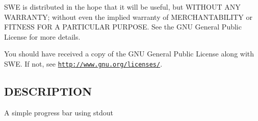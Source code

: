 S\-W\-E is distributed in the hope that it will be useful, but W\-I\-T\-H\-O\-U\-T A\-N\-Y W\-A\-R\-R\-A\-N\-T\-Y; without even the implied warranty of M\-E\-R\-C\-H\-A\-N\-T\-A\-B\-I\-L\-I\-T\-Y or F\-I\-T\-N\-E\-S\-S F\-O\-R A P\-A\-R\-T\-I\-C\-U\-L\-A\-R P\-U\-R\-P\-O\-S\-E. See the G\-N\-U General Public License for more details.

You should have received a copy of the G\-N\-U General Public License along with S\-W\-E. If not, see \href{http://www.gnu.org/licenses/}{\tt http\-://www.\-gnu.\-org/licenses/}.\hypertarget{NetCdfWriter_8hh_DESCRIPTION}{}\subsection{D\-E\-S\-C\-R\-I\-P\-T\-I\-O\-N}\label{NetCdfWriter_8hh_DESCRIPTION}
A simple progress bar using stdout 